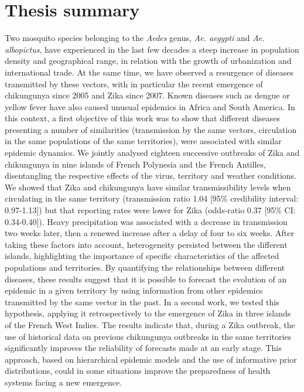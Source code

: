 \clearpage
\section*{Thesis summary}
\vspace{2em}

Two mosquito species belonging to the {\em Aedes} genus, {\em Ae. aegypti} and {\em Ae. albopictus}, have experienced in the last few decades a steep increase in population density and geographical range, in relation with the growth of urbanization and international trade.
At the same time, we have observed a resurgence of diseases transmitted by these vectors, with in particular the recent emergence of chikungunya since 2005 and Zika since 2007.
Known diseases such as dengue or yellow fever have also caused unusual epidemics in Africa and South America.
In this context, a first objective of this work was to show that different diseases presenting a number of similarities (transmission by the same vectors, circulation in the same populations of the same territories), were associated with similar epidemic dynamics.
We jointly analysed eighteen successive outbreaks of Zika and chikungunya in nine islands of French Polynesia and the French Antilles, disentangling the respective effects of the virus, territory and weather conditions. 
We showed that Zika and chikungunya have similar transmissibility levels when circulating in the same territory (transmission ratio 1.04 [95\% credibility interval: 0.97-1.13]) but that reporting rates were lower for Zika (odds-ratio 0.37 [95\% CI: 0.34-0.40]). 
Heavy precipitation was associated with a decrease in transmission two weeks later, then a renewed increase after a delay of four to six weeks. 
After taking these factors into account, heterogeneity persisted between the different islands, highlighting the importance of specific characteristics of the affected populations and territories.
By quantifying the relationships between different diseases, these results suggest that it is possible to forecast the evolution of an epidemic in a given territory by using information from other epidemics transmitted by the same vector in the past. 
In a second work, we tested this hypothesis, applying it retrospectively to the emergence of Zika in three islands of the French West Indies.
The results indicate that, during a Zika outbreak, the use of historical data on previous chikungunya outbreaks in the same territories significantly improves the reliability of forecasts made at an early stage.
This approach, based on hierarchical epidemic models and the use of informative prior distributions, could in some situations improve the preparedness of health systems facing a new emergence.

